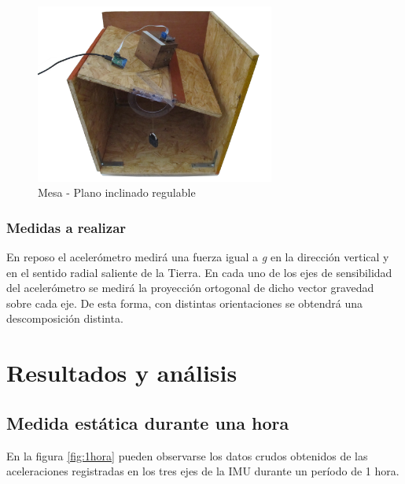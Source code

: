 \documentclass[spanish,12pt,a4paper,titlepage]{report}
\begin{document}
\begin{figure}[h!]
	\begin{center}
		\includegraphics[width=0.7\textwidth]{./pics/mesa-flotando.jpg}
	\end{center}
	\vspace{-20pt}
	\caption{Mesa - Plano inclinado regulable}
	\label{fig:mesa-flotando}
\end{figure}

\subsubsection*{Medidas a realizar}
En reposo el acelerómetro medirá una fuerza igual a \textit{g} en la dirección vertical y en el sentido radial saliente de la Tierra. En cada uno de los ejes de sensibilidad del acelerómetro se medirá la proyección ortogonal de dicho vector gravedad sobre cada eje. De esta forma, con distintas orientaciones se obtendrá una descomposición distinta.

\section{Resultados y análisis}
\subsection{Medida estática durante una hora}

En la figura \ref{fig:1hora} pueden observarse los datos crudos obtenidos de las aceleraciones registradas en los tres ejes de la IMU durante un período de 1 hora.
\end{document}
